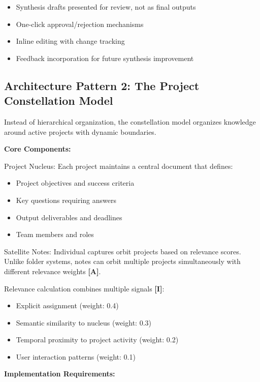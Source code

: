 \documentclass[a4paper,11pt]{article}
\newcommand{\ilabel}{\textbf{\textcolor{icolor}{[I]}}}
\newcommand{\alabel}{\textbf{\textcolor{acolor}{[A]}}}
\begin{document}
\begin{itemize}
  \item Synthesis drafts presented for review, not as final outputs
  \item One-click approval/rejection mechanisms
  \item Inline editing with change tracking
  \item Feedback incorporation for future synthesis improvement
\end{itemize}

\subsection{Architecture Pattern 2: The Project Constellation Model}

Instead of hierarchical organization, the constellation model organizes knowledge around active projects with dynamic boundaries.


\textbf{Core Components:}\par

Project Nucleus: Each project maintains a central document that defines:

\begin{itemize}
  \item Project objectives and success criteria
  \item Key questions requiring answers
  \item Output deliverables and deadlines
  \item Team members and roles
\end{itemize}

Satellite Notes: Individual captures orbit projects based on relevance scores. Unlike folder systems, notes can orbit multiple projects simultaneously with different relevance weights \alabel{}.


Relevance calculation combines multiple signals \ilabel{}:

\begin{itemize}
  \item Explicit assignment (weight: 0.4)
  \item Semantic similarity to nucleus (weight: 0.3)
  \item Temporal proximity to project activity (weight: 0.2)
  \item User interaction patterns (weight: 0.1)
\end{itemize}

\textbf{Implementation Requirements:}\par
\end{document}
